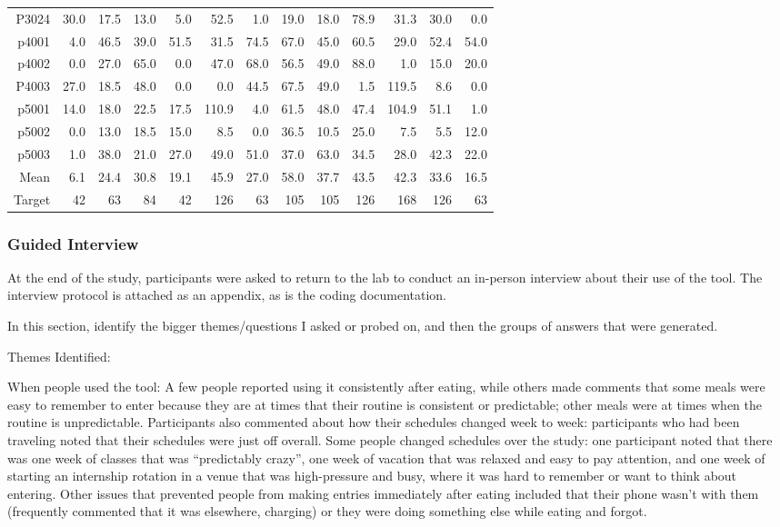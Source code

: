 \begin{table}
\begin{tabular}{rrrrrrrrrrrrr}
    P3024 & 30.0  & 17.5  & 13.0  & 5.0   & 52.5  & 1.0   & 19.0  & 18.0  & 78.9  & 31.3  & 30.0  & 0.0 \\
    p4001 & 4.0   & 46.5  & 39.0  & 51.5  & 31.5  & 74.5  & 67.0  & 45.0  & 60.5  & 29.0  & 52.4  & 54.0 \\
    p4002 & 0.0   & 27.0  & 65.0  & 0.0   & 47.0  & 68.0  & 56.5  & 49.0  & 88.0  & 1.0   & 15.0  & 20.0 \\
    P4003 & 27.0  & 18.5  & 48.0  & 0.0   & 0.0   & 44.5  & 67.5  & 49.0  & 1.5   & 119.5 & 8.6   & 0.0 \\
    p5001 & 14.0  & 18.0  & 22.5  & 17.5  & 110.9 & 4.0   & 61.5  & 48.0  & 47.4  & 104.9 & 51.1  & 1.0 \\
    p5002 & 0.0   & 13.0  & 18.5  & 15.0  & 8.5   & 0.0   & 36.5  & 10.5  & 25.0  & 7.5   & 5.5   & 12.0 \\
    p5003 & 1.0   & 38.0  & 21.0  & 27.0  & 49.0  & 51.0  & 37.0  & 63.0  & 34.5  & 28.0  & 42.3  & 22.0 \\
\midrule
    Mean  & 6.1   & 24.4  & 30.8  & 19.1  & 45.9  & 27.0  & 58.0  & 37.7  & 43.5  & 42.3  & 33.6  & 16.5 \\
\midrule
    Target  & 42   & 63  & 84  & 42  & 126  & 63  & 105  & 105  & 126  & 168  & 126  & 63 \\
    \bottomrule
    \end{tabular}%
  \label{tab:insituComponentCounts}%
\end{table}%


\subsubsection{Guided Interview}
At the end of the study, participants were asked to return to the lab to conduct an in-person interview about their use of the tool. The interview protocol is attached as an appendix, as is the coding documentation. 

In this section, identify the bigger themes/questions I asked or probed on, and then the groups of answers that were generated. 

Themes Identified: 

When people used the tool: A few people reported using it consistently after eating, while others made comments that some meals were easy to remember to enter because they are at times that their routine is consistent or predictable; other meals were at times when the routine is unpredictable. Participants also commented about how their schedules changed week to week: participants who had been traveling noted that their schedules were just off overall. Some people changed schedules over the study: one participant noted that there was one week of classes that was ``predictably crazy'', one week of vacation that was relaxed and easy to pay attention, and one week of starting an internship rotation in a venue that was high-pressure and busy, where it was hard to remember or want to think about entering. Other issues that prevented people from making entries immediately after eating included that their phone wasn't with them (frequently commented that it was elsewhere, charging) or they were doing something else while eating and forgot. 

